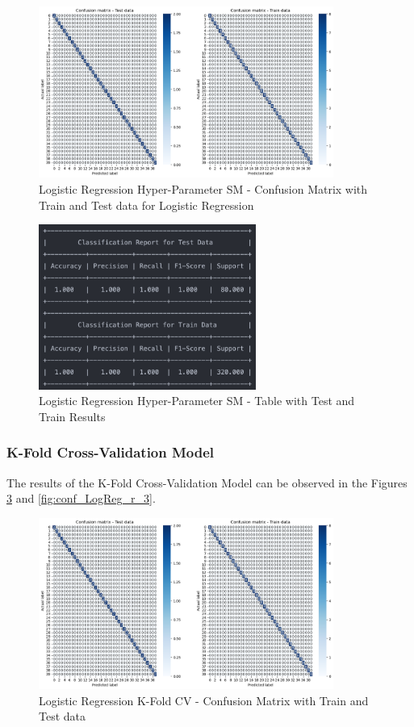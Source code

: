 \documentclass[conference]{IEEEtran}
\begin{document}
\begin{figure}[H]
    \centering
    \includegraphics[width=3.8in]{LogReg/logreg_2.png}%
    \caption{Logistic Regression Hyper-Parameter SM - Confusion Matrix with Train and Test data for Logistic Regression}%
    \label{fig:conf_LogReg_2}%
\end{figure}

\begin{figure}[H]
    \centering
    \includegraphics[width=2.8in]{LogReg/logreg_r_2.png}%
    \caption{Logistic Regression Hyper-Parameter SM - Table with Test and Train Results}%
    \label{fig:conf_LogReg_r_2}%
\end{figure}

\subsubsection{K-Fold Cross-Validation Model}
The results of the K-Fold Cross-Validation Model can be observed in the Figures \ref{fig:conf_LogReg_3} and \ref{fig:conf_LogReg_r_3}. 

\begin{figure}[H]
    \centering
    \includegraphics[width=3.8in]{LogReg/logreg_3.png}%
    \caption{Logistic Regression K-Fold CV - Confusion Matrix with Train and Test data}%
    \label{fig:conf_LogReg_3}%
\end{figure}
\end{document}
